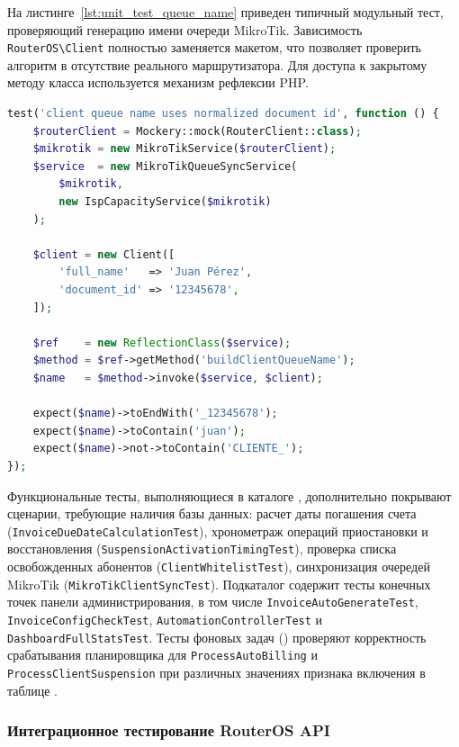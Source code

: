 На листинге~\ref{lst:unit_test_queue_name} приведен типичный модульный тест, проверяющий генерацию имени очереди MikroTik. Зависимость \texttt{RouterOS\textbackslash Client} полностью заменяется макетом, что позволяет проверить алгоритм в отсутствие реального маршрутизатора. Для доступа к закрытому методу класса используется механизм рефлексии PHP.

\begin{lstlisting}[language=PHP,caption={Модульный тест генерации имени очереди абонента},label={lst:unit_test_queue_name}]
test('client queue name uses normalized document id', function () {
    $routerClient = Mockery::mock(RouterClient::class);
    $mikrotik = new MikroTikService($routerClient);
    $service  = new MikroTikQueueSyncService(
        $mikrotik,
        new IspCapacityService($mikrotik)
    );

    $client = new Client([
        'full_name'   => 'Juan Pérez',
        'document_id' => '12345678',
    ]);

    $ref    = new ReflectionClass($service);
    $method = $ref->getMethod('buildClientQueueName');
    $name   = $method->invoke($service, $client);

    expect($name)->toEndWith('_12345678');
    expect($name)->toContain('juan');
    expect($name)->not->toContain('CLIENTE_');
});
\end{lstlisting}

Функциональные тесты, выполняющиеся в каталоге , дополнительно покрывают сценарии, требующие наличия базы данных: расчет даты погашения счета (\texttt{InvoiceDueDateCalculationTest}), хронометраж операций приостановки и восстановления (\texttt{SuspensionActivationTimingTest}), проверка списка освобожденных абонентов (\texttt{ClientWhitelistTest}), синхронизация очередей MikroTik (\texttt{MikroTikClientSyncTest}). Подкаталог  содержит тесты конечных точек панели администрирования, в том числе \texttt{InvoiceAutoGenerateTest}, \texttt{InvoiceConfigCheckTest}, \texttt{AutomationControllerTest} и \texttt{DashboardFullStatsTest}. Тесты фоновых задач () проверяют корректность срабатывания планировщика для \texttt{ProcessAutoBilling} и \texttt{ProcessClientSuspension} при различных значениях признака включения в таблице .

\subsubsection{Интеграционное тестирование RouterOS API}

